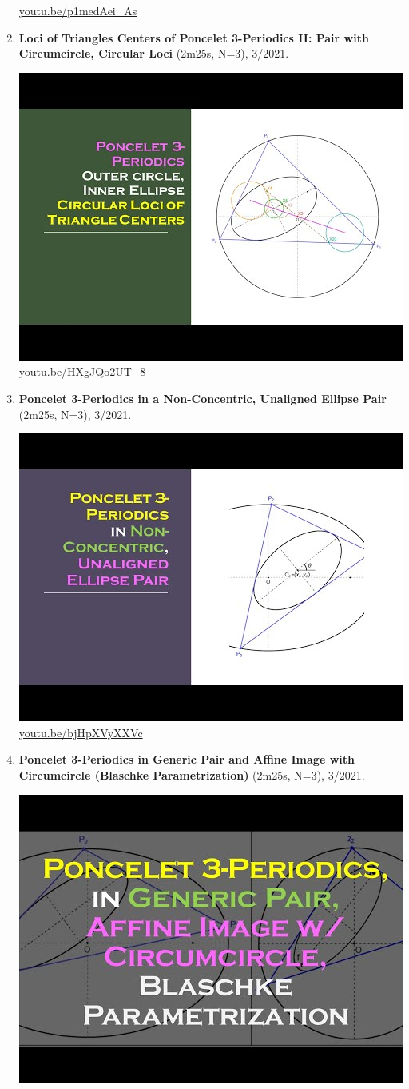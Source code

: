 \documentclass[12pt]{amsart}
\begin{document}
\begin{enumerate}[resume]
\begin{center}
\href{https://youtu.be/p1medAei_As}{\url{youtu.be/p1medAei\_As}}\end{center}
% 
\item \textbf{Loci of Triangles Centers of Poncelet 3-Periodics II: Pair with Circumcircle, Circular Loci} (2m25s, N=3), 3/2021. 
\begin{center}\includegraphics[width=.5\textwidth]{pics/HXgJQo2UT_8.jpg} \\ 
\href{https://youtu.be/HXgJQo2UT_8}{\url{youtu.be/HXgJQo2UT\_8}}\end{center}
% 
\item \textbf{Poncelet 3-Periodics in a Non-Concentric, Unaligned Ellipse Pair} (2m25s, N=3), 3/2021. 
\begin{center}\includegraphics[width=.5\textwidth]{pics/bjHpXVyXXVc.jpg} \\ 
\href{https://youtu.be/bjHpXVyXXVc}{\url{youtu.be/bjHpXVyXXVc}}\end{center}
% 
\item \textbf{Poncelet 3-Periodics in Generic Pair and Affine Image with Circumcircle (Blaschke Parametrization)} (2m25s, N=3), 3/2021. 
\begin{center}\includegraphics[width=.5\textwidth]{pics/6xSFBLWIkTM.jpg} \\ 

\end{center}
\end{enumerate}
\end{document}

